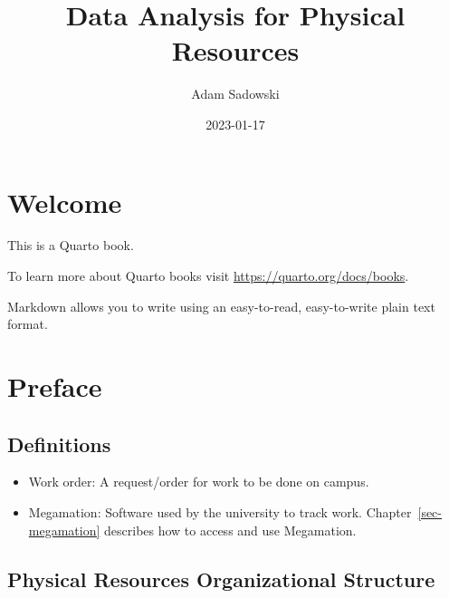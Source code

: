 \documentclass[
  letterpaper,
  DIV=11,
  numbers=noendperiod,
  oneside]{scrreprt}
\title{Data Analysis for Physical Resources}
\author{Adam Sadowski}
\date{2023-01-17}
\renewcommand*\contentsname{Table of contents}
\newcommand\contentsname{Table of contents}
\begin{document}
\maketitle
\ifdefined\Shaded\renewenvironment{Shaded}{\begin{tcolorbox}[interior hidden, breakable, boxrule=0pt, enhanced, frame hidden, sharp corners, borderline west={3pt}{0pt}{shadecolor}]}{\end{tcolorbox}}\fi

\renewcommand*\contentsname{Table of contents}
{
\hypersetup{linkcolor=}
\setcounter{tocdepth}{2}
\tableofcontents
}

\hypertarget{welcome}{%
\chapter*{Welcome}\label{welcome}}

This is a Quarto book.

To learn more about Quarto books visit
\url{https://quarto.org/docs/books}.

Markdown allows you to write using an easy-to-read,
easy-to-write plain text format.


\hypertarget{preface}{%
\chapter*{Preface}\label{preface}}

\hypertarget{definitions}{%
\section*{Definitions}\label{definitions}}

\begin{itemize}
\item
  Work order: A request/order for work to be done on campus.
\item
  Megamation: Software used by the university to track work.
  Chapter~\ref{sec-megamation} describes how to access and use
  Megamation.
\end{itemize}

\hypertarget{physical-resources-organizational-structure}{%
\section*{Physical Resources Organizational
Structure}\label{physical-resources-organizational-structure}}
\end{document}
